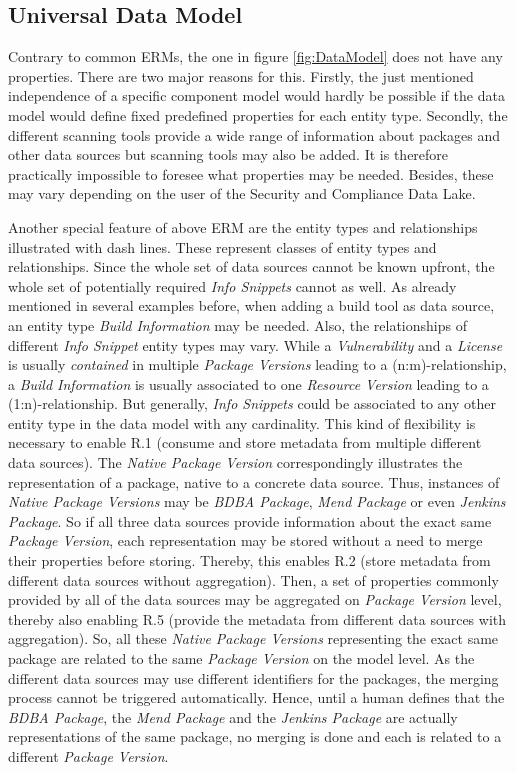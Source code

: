 \subsection{Universal Data Model}
Contrary to common ERMs, the one in figure \ref{fig:DataModel} does not have any properties. There are two major reasons for this. Firstly, the just mentioned independence of a specific component model would hardly be possible if the data model would define fixed predefined properties for each entity type. Secondly, the different scanning tools provide a wide range of information about packages and other data sources but scanning tools may also be added. It is therefore practically impossible to foresee what properties may be needed. Besides, these may vary depending on the user of the Security and Compliance Data Lake.\par
Another special feature of above ERM are the entity types and relationships illustrated with dash lines. These represent classes of entity types and relationships. Since the whole set of data sources cannot be known upfront, the whole set of potentially required \emph{Info Snippets} cannot as well. As already mentioned in several examples before, when adding a build tool as data source, an entity type \emph{Build Information} may be needed. Also, the relationships of different \emph{Info Snippet} entity types may vary. While a \emph{Vulnerability} and a \emph{License} is usually \emph{contained} in multiple \emph{Package Versions} leading to a (n:m)-relationship, a \emph{Build Information} is usually associated to one \emph{Resource Version} leading to a (1:n)-relationship. But generally, \emph{Info Snippets} could be associated to any other entity type in the data model with any cardinality. This kind of flexibility is necessary to enable R.1 (consume and store metadata from multiple different data sources). The \emph{Native Package Version} correspondingly illustrates the representation of a package, native to a concrete data source. Thus, instances of \emph{Native Package Versions} may be \emph{BDBA Package}, \emph{Mend Package} or even \emph{Jenkins Package}. So if all three data sources provide information about the exact same \emph{Package Version}, each representation may be stored without a need to merge their properties before storing. Thereby, this enables R.2 (store metadata from different data sources without aggregation). Then, a set of properties commonly provided by all of the data sources may be aggregated on \emph{Package Version} level, thereby also enabling R.5 (provide the metadata from different data sources with aggregation). So, all these \emph{Native Package Versions} representing the exact same package are related to the same \emph{Package Version} on the model level. As the different data sources may use different identifiers for the packages, the merging process cannot be triggered automatically. Hence, until a human defines that the \emph{BDBA Package}, the \emph{Mend Package} and the \emph{Jenkins Package} are actually representations of the same package, no merging is done and each is related to a different \emph{Package Version}.\\\par
